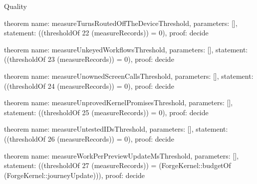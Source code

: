 \begin{lexlean}{Quality}
\begin{semanticmodule}
theorem{
  name: measureTurnsRoutedOffTheDeviceThreshold,
  parameters: [],
  statement: ((thresholdOf 22 (measureRecords)) = 0),
  proof: decide{}
}

theorem{
  name: measureUnkeyedWorkflowsThreshold,
  parameters: [],
  statement: ((thresholdOf 23 (measureRecords)) = 0),
  proof: decide{}
}

theorem{
  name: measureUnownedScreenCallsThreshold,
  parameters: [],
  statement: ((thresholdOf 24 (measureRecords)) = 0),
  proof: decide{}
}

theorem{
  name: measureUnprovedKernelPromisesThreshold,
  parameters: [],
  statement: ((thresholdOf 25 (measureRecords)) = 0),
  proof: decide{}
}

theorem{
  name: measureUntestedIDsThreshold,
  parameters: [],
  statement: ((thresholdOf 26 (measureRecords)) = 0),
  proof: decide{}
}

theorem{
  name: measureWorkPerPreviewUpdateMsThreshold,
  parameters: [],
  statement: ((thresholdOf 27 (measureRecords)) = (ForgeKernel::budgetOf (ForgeKernel::journeyUpdate))),
  proof: decide{}
}
\end{semanticmodule}
\end{lexlean}
